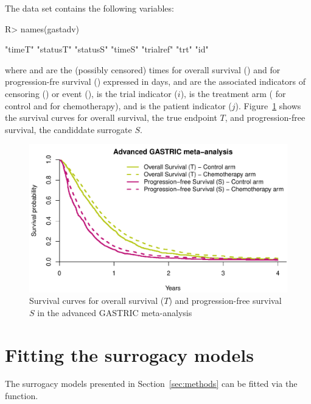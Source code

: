 \documentclass[article,shortnames, nojss]{jss}\usepackage[]{graphicx}\usepackage[]{color}
\begin{document}
The data set contains the following variables:
\begin{Schunk}
\begin{Sinput}
R> names(gastadv)
\end{Sinput}
\begin{Soutput}
[1] "timeT"    "statusT"  "statusS"  "timeS"    "trialref" "trt"      "id"      
\end{Soutput}
\end{Schunk}
where  and  are the (possibly censored) times 
for overall survival () and
for progression-fre survival () expressed in days,
 and  are the associated indicators of
censoring () or event (),
 is the trial indicator ($i$),
 is the treatment arm ( for control and  for chemotherapy),
and  is the patient indicator ($j$).
Figure~\ref{fig:survCurves} shows the survival curves for overall survival,
the true endpoint $T$, and progression-free survival,
the candiddate surrogate $S$.
\begin{Schunk}
\begin{figure}
\includegraphics[width=\textwidth]{./survCurves-1} \caption[Survival curves for overall survival ($T$) and progression-free survival $S$ in the advanced GASTRIC meta-analysis \citep{GASTRIC13}]{Survival curves for overall survival ($T$) and progression-free survival $S$ in the advanced GASTRIC meta-analysis \citep{GASTRIC13}}\label{fig:survCurves}
\end{figure}
\end{Schunk}

  
\section{Fitting the surrogacy models}
  The surrogacy models presented in Section~\ref{sec:methods}
  can be fitted via the  function.
  
\end{document}
